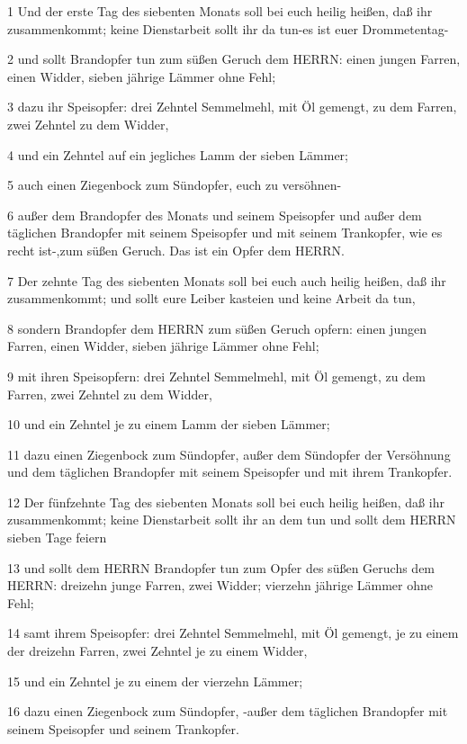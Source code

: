 \par 1 Und der erste Tag des siebenten Monats soll bei euch heilig heißen, daß ihr zusammenkommt; keine Dienstarbeit sollt ihr da tun-es ist euer Drommetentag-
\par 2 und sollt Brandopfer tun zum süßen Geruch dem HERRN: einen jungen Farren, einen Widder, sieben jährige Lämmer ohne Fehl;
\par 3 dazu ihr Speisopfer: drei Zehntel Semmelmehl, mit Öl gemengt, zu dem Farren, zwei Zehntel zu dem Widder,
\par 4 und ein Zehntel auf ein jegliches Lamm der sieben Lämmer;
\par 5 auch einen Ziegenbock zum Sündopfer, euch zu versöhnen-
\par 6 außer dem Brandopfer des Monats und seinem Speisopfer und außer dem täglichen Brandopfer mit seinem Speisopfer und mit seinem Trankopfer, wie es recht ist-,zum süßen Geruch. Das ist ein Opfer dem HERRN.
\par 7 Der zehnte Tag des siebenten Monats soll bei euch auch heilig heißen, daß ihr zusammenkommt; und sollt eure Leiber kasteien und keine Arbeit da tun,
\par 8 sondern Brandopfer dem HERRN zum süßen Geruch opfern: einen jungen Farren, einen Widder, sieben jährige Lämmer ohne Fehl;
\par 9 mit ihren Speisopfern: drei Zehntel Semmelmehl, mit Öl gemengt, zu dem Farren, zwei Zehntel zu dem Widder,
\par 10 und ein Zehntel je zu einem Lamm der sieben Lämmer;
\par 11 dazu einen Ziegenbock zum Sündopfer, außer dem Sündopfer der Versöhnung und dem täglichen Brandopfer mit seinem Speisopfer und mit ihrem Trankopfer.
\par 12 Der fünfzehnte Tag des siebenten Monats soll bei euch heilig heißen, daß ihr zusammenkommt; keine Dienstarbeit sollt ihr an dem tun und sollt dem HERRN sieben Tage feiern
\par 13 und sollt dem HERRN Brandopfer tun zum Opfer des süßen Geruchs dem HERRN: dreizehn junge Farren, zwei Widder; vierzehn jährige Lämmer ohne Fehl;
\par 14 samt ihrem Speisopfer: drei Zehntel Semmelmehl, mit Öl gemengt, je zu einem der dreizehn Farren, zwei Zehntel je zu einem Widder,
\par 15 und ein Zehntel je zu einem der vierzehn Lämmer;
\par 16 dazu einen Ziegenbock zum Sündopfer, -außer dem täglichen Brandopfer mit seinem Speisopfer und seinem Trankopfer.
